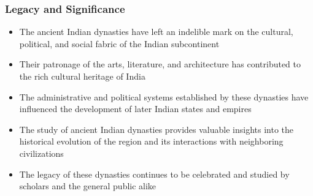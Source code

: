 \begin{frame}[fragile]\frametitle{Legacy and Significance}
    \begin{itemize}
        \item The ancient Indian dynasties have left an indelible mark on the cultural, political, and social fabric of the Indian subcontinent
        \item Their patronage of the arts, literature, and architecture has contributed to the rich cultural heritage of India
        \item The administrative and political systems established by these dynasties have influenced the development of later Indian states and empires
        \item The study of ancient Indian dynasties provides valuable insights into the historical evolution of the region and its interactions with neighboring civilizations
        \item The legacy of these dynasties continues to be celebrated and studied by scholars and the general public alike
    \end{itemize}
\end{frame}
